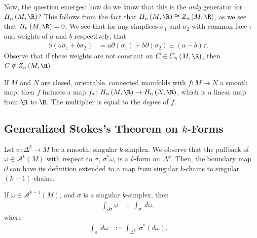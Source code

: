 \documentclass[10pt]{mypackage}
\begin{document}
Now, the question emerges: how do we know that this is the \textit{only} generator for $H_n\left( M,\R \right)$? This follows from the fact that $H_n\left( M,\R \right)\cong Z_n\left( M,\R \right)$, as we see that $B_n\left( M,\R \right) = 0$. We see that for any simplices $\sigma_1$ and $\sigma_2$ with common face $\tau$ and weights of $a$ and $b$ respectively, that
\begin{align*}
  \partial \left( a\sigma_1 + b\sigma_2 \right) &= a \partial\left( \sigma_1 \right) + b\partial\left( \sigma_2 \right) \pm \left( a-b \right)\tau.
\end{align*}
Observe that if these weights are not constant on $C\in C_n\left( M,\R \right)$, then $C\notin Z_n\left( M,\R \right)$.
\begin{definition}
  If $M$ and $N$ are closed, orientable, connected manifolds with $f\colon M\rightarrow N$ a smooth map, then $f$ induces a map $f_{\ast}\colon H_{n}\left( M,\R \right)\rightarrow H_n\left( N,\R \right)$, which is a linear map from $\R$ to $\R$. The multiplier is equal to the \textit{degree} of $f$.
\end{definition}
\subsection{Generalized Stokes's Theorem on $k$-Forms}%
Let $\sigma\colon \Delta^{k}\rightarrow M$ be a smooth, singular $k$-simplex. We observe that the pullback of $\omega\in \mathcal{A}^{k}\left( M \right)$ with respect to $\sigma$, $\sigma^{\ast}\omega$, is a $k$-form on $\Delta^{k}$. Then, the boundary map $\partial$ can have its definition extended to a map from singular $k$-chains to singular $\left( k-1 \right)$-chains.
\begin{theorem}
  If $\omega\in \mathcal{A}^{k-1}\left( M \right)$, and $\sigma$ is a singular $k$-simplex, then
  \begin{align*}
    \int_{\partial \sigma}^{} \omega &= \int_{\sigma}^{} \:d\omega,
  \end{align*}
  where
  \begin{align*}
    \int_{\sigma}^{} \:d\omega &\coloneq \int_{\Delta^{k}}^{} \:\sigma^{\ast}\left( d\omega \right).
  \end{align*}
\end{theorem}
\end{document}
